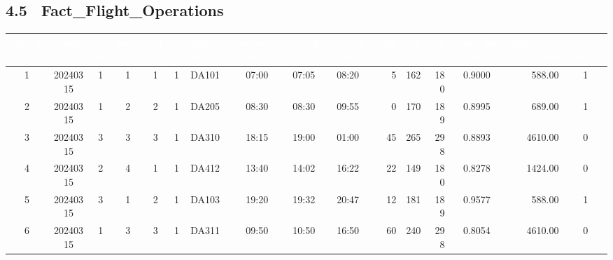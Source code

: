 \documentclass[11pt]{article}
\begin{document}
\subsection*{4.5 \ Fact_Flight_Operations}
{\footnotesize
\begin{adjustbox}{max width=\linewidth}
\begin{tabular}{@{}c c c c c c l c c c r r r c r c@{}}
\toprule
\rowcolor{tblHead}
\textcolor{white}{ops_key} & \textcolor{white}{fdate} & \textcolor{white}{tod} &
\textcolor{white}{route} & \textcolor{white}{acft} & \textcolor{white}{al} &
\textcolor{white}{flight_no} & \textcolor{white}{sched_dep} & \textcolor{white}{act_dep} &
\textcolor{white}{arr_time} & \textcolor{white}{delay} & \textcolor{white}{pax} &
\textcolor{white}{cap} & \textcolor{white}{load_factor} & \textcolor{white}{distance_km} &
\textcolor{white}{on_time}\\
\midrule
1 & 20240315 & 1 & 1 & 1 & 1 & DA101 & 07:00 & 07:05 & 08:20 &  5 & 162 & 180 & 0.9000 &  588.00 & 1\\
2 & 20240315 & 1 & 2 & 2 & 1 & DA205 & 08:30 & 08:30 & 09:55 &  0 & 170 & 189 & 0.8995 &  689.00 & 1\\
3 & 20240315 & 3 & 3 & 3 & 1 & DA310 & 18:15 & 19:00 & 01:00 & 45 & 265 & 298 & 0.8893 & 4610.00 & 0\\
4 & 20240315 & 2 & 4 & 1 & 1 & DA412 & 13:40 & 14:02 & 16:22 & 22 & 149 & 180 & 0.8278 & 1424.00 & 0\\
5 & 20240315 & 3 & 1 & 2 & 1 & DA103 & 19:20 & 19:32 & 20:47 & 12 & 181 & 189 & 0.9577 &  588.00 & 1\\
6 & 20240315 & 1 & 3 & 3 & 1 & DA311 & 09:50 & 10:50 & 16:50 & 60 & 240 & 298 & 0.8054 & 4610.00 & 0\\
\bottomrule
\end{tabular}
\end{adjustbox}}
\end{document}

